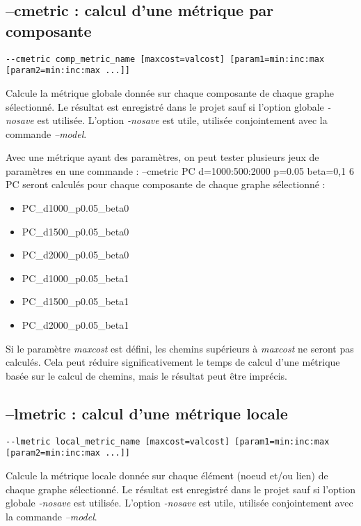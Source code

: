 \documentclass[a4paper,10pt]{report}
\newenvironment{cmd}
{\quote\Verbatim}
{\endVerbatim\endquote}
\begin{document}
\subsection{--cmetric : calcul d'une métrique par composante}
\begin{verbatim}
--cmetric comp_metric_name [maxcost=valcost] [param1=min:inc:max [param2=min:inc:max ...]]
\end{verbatim}
Calcule la métrique globale donnée sur chaque composante de chaque graphe sélectionné.
Le résultat est enregistré dans le projet sauf si l'option globale \textit{-nosave} est utilisée. L'option \textit{-nosave} est utile, utilisée conjointement avec la commande \textit{--model}.

Avec une métrique ayant des paramètres, on peut tester plusieurs jeux de paramètres en une commande :
\begin{cmd}
--cmetric PC d=1000:500:2000 p=0.05 beta=0,1
\end{cmd}
6 PC seront calculés pour chaque composante de chaque graphe sélectionné :
\begin{itemize}
 \item PC\_d1000\_p0.05\_beta0
 \item PC\_d1500\_p0.05\_beta0
 \item PC\_d2000\_p0.05\_beta0
 \item PC\_d1000\_p0.05\_beta1
 \item PC\_d1500\_p0.05\_beta1
 \item PC\_d2000\_p0.05\_beta1
\end{itemize}

Si le paramètre \textit{maxcost} est défini, les chemins supérieurs à \textit{maxcost} ne seront pas calculés. 
Cela peut réduire significativement le temps de calcul d'une métrique basée sur le calcul de chemins, mais le résultat peut être imprécis.

\subsection{--lmetric : calcul d'une métrique locale}
\begin{verbatim}
--lmetric local_metric_name [maxcost=valcost] [param1=min:inc:max [param2=min:inc:max ...]] 
\end{verbatim}
Calcule la métrique locale donnée sur chaque élément (noeud et/ou lien) de chaque graphe sélectionné.
Le résultat est enregistré dans le projet sauf si l'option globale \textit{-nosave} est utilisée. L'option \textit{-nosave} est utile, utilisée conjointement avec la commande \textit{--model}.
\end{document}
